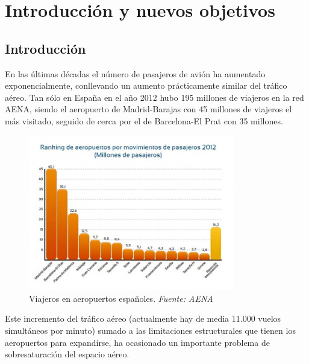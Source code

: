 \chapter{Introducción y nuevos objetivos}
\label{introduccción}
\section{Introducción}
En las últimas décadas el número de pasajeros de avión  ha aumentado exponencialmente, conllevando un aumento prácticamente similar del tráfico aéreo. Tan sólo en España en el año 2012 hubo 195 millones de viajeros en la red AENA, siendo el aeropuerto de Madrid-Barajas con 45 millones de viajeros el más visitado, seguido de cerca por el de Barcelona-El Prat con 35 millones. \\
\begin{figure}[H]
	\begin{center}
		\centering
		\includegraphics[width=0.8\textwidth]{./imagenes/introduccion/Ranking_de_aeropuertos_espayoles_por_pasajeros_horiz.jpg}
		\caption{Viajeros en aeropuertos españoles. \textit{Fuente: AENA}}
		\label{fig: Viajeros en aeropuertos españoles}
	\end{center}
\end{figure}
Este incremento del tráfico aéreo (actualmente hay de media 11.000 vuelos simultáneos por minuto) sumado a las limitaciones estructurales que tienen los aeropuertos para expandirse, ha ocasionado un importante problema de sobresaturación del espacio aéreo.\\
	

